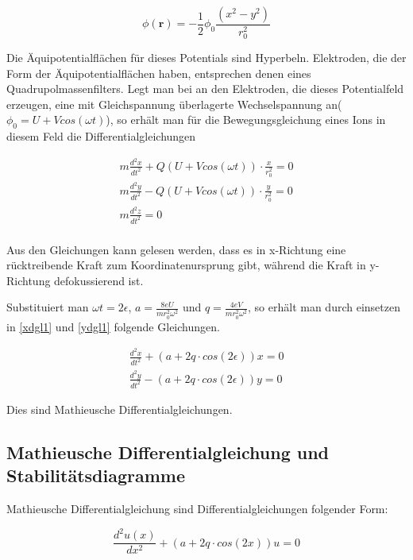 \documentclass[10pt,a4paper]{article}
\begin{document}
\begin{equation}
	\phi (\textbf{r}) = - \frac{1}{2} \phi _0 \frac{(x^2 - y^2)}{r_0^2}
	\label{potential2}
\end{equation}

Die Äquipotentialflächen für dieses Potentials sind Hyperbeln. Elektroden, die der Form der Äquipotentialflächen haben, entsprechen denen eines Quadrupolmassenfilters. Legt man bei an den Elektroden, die dieses Potentialfeld erzeugen, eine mit Gleichspannung überlagerte Wechselspannung an($\phi _0 = U + V cos(\omega t)$), so erhält man für die Bewegungsgleichung eines Ions in diesem Feld die Differentialgleichungen

\begin{align}
	m\frac{d^2x}{dt^2} + Q(U + V cos(\omega t)) \cdot \frac{x}{r_0^2} = 0 
	\label{xdgl1}\\
	m\frac{d^2y}{dt^2} - Q(U + V cos(\omega t)) \cdot \frac{y}{r_0^2} = 0 
	\label{ydgl1}\\
	m\frac{d^2z}{dt^2} = 0 \\
\end{align}

Aus den Gleichungen kann gelesen werden, dass es in x-Richtung eine rücktreibende Kraft zum Koordinatenursprung gibt, während die Kraft in y-Richtung defokussierend ist.

Substituiert man $\omega t = 2\epsilon$, $a = \frac{8 e U}{m r_0^2 \omega^2}$ und $q = \frac{4 e V}{m r_0^2 \omega^2}$, so erhält man durch einsetzen in \ref{xdgl1} und \ref{ydgl1} folgende Gleichungen.

\begin{align}
	\frac{d^2x}{dt^2} + (a + 2q \cdot cos(2\epsilon)) x = 0\\
	\frac{d^2y}{dt^2} - (a + 2q \cdot cos(2\epsilon)) y = 0
\end{align}

Dies sind Mathieusche Differentialgleichungen.



\subsection{Mathieusche Differentialgleichung und Stabilitätsdiagramme}

Mathieusche Differentialgleichung sind Differentialgleichungen folgender Form:

\begin{equation}
	\frac{d^2u(x)}{dx^2} + (a + 2q \cdot cos(2x)) u = 0
\end{equation}
\end{document}
